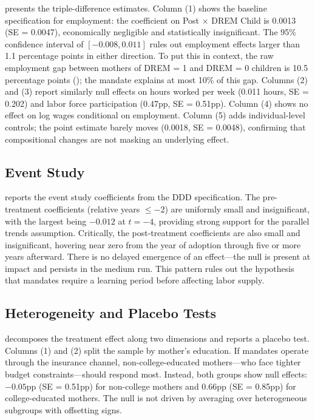 \documentclass[12pt]{article}
\begin{document}
 presents the triple-difference estimates. Column (1) shows the baseline specification for employment: the coefficient on Post $\times$ DREM Child is 0.0013 (SE = 0.0047), economically negligible and statistically insignificant. The 95\% confidence interval of $[-0.008, 0.011]$ rules out employment effects larger than 1.1 percentage points in either direction. To put this in context, the raw employment gap between mothers of DREM = 1 and DREM = 0 children is 10.5 percentage points (); the mandate explains at most 10\% of this gap. Columns (2) and (3) report similarly null effects on hours worked per week (0.011 hours, SE = 0.202) and labor force participation (0.47pp, SE = 0.51pp). Column (4) shows no effect on log wages conditional on employment. Column (5) adds individual-level controls; the point estimate barely moves (0.0018, SE = 0.0048), confirming that compositional changes are not masking an underlying effect.

\subsection{Event Study}



 reports the event study coefficients from the DDD specification. The pre-treatment coefficients (relative years $\leq -2$) are uniformly small and insignificant, with the largest being $-0.012$ at $t = -4$, providing strong support for the parallel trends assumption. Critically, the post-treatment coefficients are also small and insignificant, hovering near zero from the year of adoption through five or more years afterward. There is no delayed emergence of an effect---the null is present at impact and persists in the medium run. This pattern rules out the hypothesis that mandates require a learning period before affecting labor supply.

\subsection{Heterogeneity and Placebo Tests}



 decomposes the treatment effect along two dimensions and reports a placebo test. Columns (1) and (2) split the sample by mother's education. If mandates operate through the insurance channel, non-college-educated mothers---who face tighter budget constraints---should respond most. Instead, both groups show null effects: $-0.05$pp (SE = 0.51pp) for non-college mothers and 0.66pp (SE = 0.85pp) for college-educated mothers. The null is not driven by averaging over heterogeneous subgroups with offsetting signs.
\end{document}
